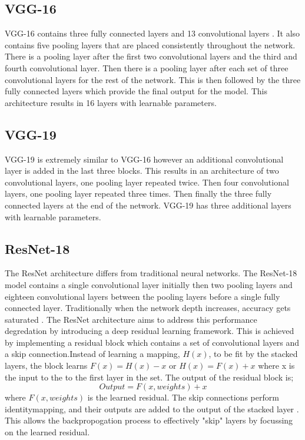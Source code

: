 \documentclass[10pt,twocolumn,letterpaper]{article}
\begin{document}
\subsection{VGG-16}
VGG-16 contains three fully connected layers and 13 convolutional layers \cite{LINKON2021100582}.
It also contains five pooling layers that are placed consistently throughout the network.
There is a pooling layer after the first two convolutional layers and the third and fourth 
convolutional layer. Then there is a pooling layer after each set of three convolutional 
layers for the rest of the network. This is then followed by the three fully connected 
layers which provide the final output for the model. This architecture results in 16 
layers with learnable parameters.
\subsection{VGG-19}
VGG-19 is extremely similar to VGG-16 however an additional convolutional layer is added 
in the last three blocks. This results in an architecture of two convolutional layers, one 
pooling layer repeated twice. Then four convolutional layers, one pooling layer repeated 
three times. Then finally the three fully connected layers at the end of the network. 
VGG-19 has three additional layers with learnable parameters.

\subsection{ResNet-18}
The ResNet architecture differs from traditional neural networks. 
The ResNet-18 model contains a single convolutional layer initially then two pooling 
layers and eighteen convolutional layers between the pooling layers before a single 
fully connected layer. Traditionally when the network depth increases, accuracy gets 
saturated \cite{https://doi.org/10.48550/arxiv.1512.03385}. The ResNet architecture aims 
to address this performance degredation by introducing a deep residual learning framework.
This is achieved by implementing a residual block which contains a set of convolutional 
layers and a skip connection.Instead of learning a 
mapping, $H(x)$, to be fit by the stacked layers, the block learns $F(x) = H(x) - x$ or 
$H(x) = F(x) + x$ where x is the input to the to the first layer in the set. The output of 
the residual block is;
\begin{equation}
   Output = F(x,weights) +x
\end{equation}
where $F(x,weights)$ is the learned residual. The skip connections perform identitymapping, and their 
outputs are added to the output of the stacked layer \cite{https://doi.org/10.48550/arxiv.1512.03385}.
This allows the backpropogation process to effectively "skip" layers by focussing on the 
learned residual.
\end{document}
